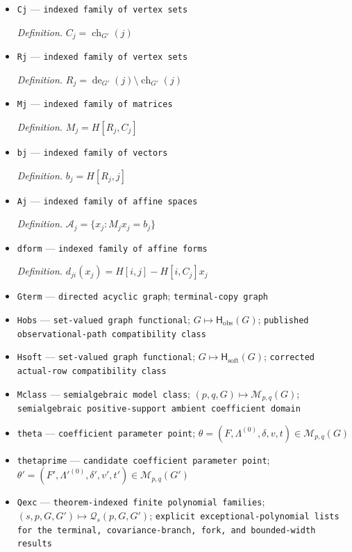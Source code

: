 \documentclass{article}
\begin{document}
\begin{itemize}
  \item \texttt{Cj} --- \texttt{indexed family of vertex sets}
  \par\smallskip\noindent\emph{Definition.} \(C_j=\operatorname{ch}_{G'}(j)\)
  \item \texttt{Rj} --- \texttt{indexed family of vertex sets}
  \par\smallskip\noindent\emph{Definition.} \(R_j=\operatorname{de}_{G'}(j)\setminus\operatorname{ch}_{G'}(j)\)
  \item \texttt{Mj} --- \texttt{indexed family of matrices}
  \par\smallskip\noindent\emph{Definition.} \(M_j=H[R_j,C_j]\)
  \item \texttt{bj} --- \texttt{indexed family of vectors}
  \par\smallskip\noindent\emph{Definition.} \(b_j=H[R_j,j]\)
  \item \texttt{Aj} --- \texttt{indexed family of affine spaces}
  \par\smallskip\noindent\emph{Definition.} \(\mathcal A_j=\{x_j:M_jx_j=b_j\}\)
  \item \texttt{dform} --- \texttt{indexed family of affine forms}
  \par\smallskip\noindent\emph{Definition.} \(d_{ji}(x_j)=H[i,j]-H[i,C_j]x_j\)
  \item \texttt{Gterm} --- \texttt{directed acyclic graph}; \texttt{terminal-\allowbreak{}copy graph}
  \item \texttt{Hobs} --- \texttt{set-\allowbreak{}valued graph functional}; \(G\mapsto\mathsf H_{\mathrm{obs}}(G)\); \texttt{published observational-\allowbreak{}path compatibility class}
  \item \texttt{Hsoft} --- \texttt{set-\allowbreak{}valued graph functional}; \(G\mapsto\mathsf H_{\mathrm{soft}}(G)\); \texttt{corrected actual-\allowbreak{}row compatibility class}
  \item \texttt{Mclass} --- \texttt{semialgebraic model class}; \((p,q,G)\mapsto\mathcal M_{p,q}(G)\); \texttt{semialgebraic positive-\allowbreak{}support ambient coefficient domain}
  \item \texttt{theta} --- \texttt{coefficient parameter point}; \(\theta=(F,\Lambda^{(0)},\delta,v,t)\in\mathcal M_{p,q}(G)\)
  \item \texttt{thetaprime} --- \texttt{candidate coefficient parameter point}; \(\theta'=(F',\Lambda'^{(0)},\delta',v',t')\in\mathcal M_{p,q}(G')\)
  \item \texttt{Qexc} --- \texttt{theorem-\allowbreak{}indexed finite polynomial families}; \((s,p,G,G')\mapsto\mathcal Q_s(p,G,G')\); \texttt{explicit exceptional-\allowbreak{}polynomial lists for the terminal,\allowbreak{} covariance-\allowbreak{}branch,\allowbreak{} fork,\allowbreak{} and bounded-\allowbreak{}width results}

\end{itemize}
\end{document}
